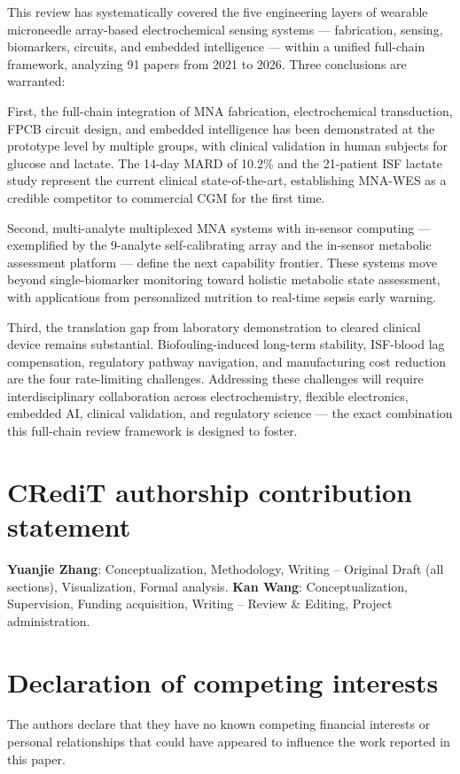\documentclass[review,1p]{elsarticle}
\begin{document}
This review has systematically covered the five engineering layers of wearable microneedle array-based electrochemical sensing systems — fabrication, sensing, biomarkers, circuits, and embedded intelligence — within a unified full-chain framework, analyzing 91 papers from 2021 to 2026. Three conclusions are warranted:

First, the full-chain integration of MNA fabrication, electrochemical transduction, FPCB circuit design, and embedded intelligence has been demonstrated at the prototype level by multiple groups, with clinical validation in human subjects for glucose and lactate. The 14-day MARD of 10.2\% \cite{Yang2023CGM14day} and the 21-patient ISF lactate study \cite{Djassemi2026ACSsens} represent the current clinical state-of-the-art, establishing MNA-WES as a credible competitor to commercial CGM for the first time.

Second, multi-analyte multiplexed MNA systems with in-sensor computing — exemplified by the 9-analyte self-calibrating array \cite{Li2025Innovation} and the in-sensor metabolic assessment platform \cite{Fan2026EdgeAI} — define the next capability frontier. These systems move beyond single-biomarker monitoring toward holistic metabolic state assessment, with applications from personalized nutrition to real-time sepsis early warning.

Third, the translation gap from laboratory demonstration to cleared clinical device remains substantial. Biofouling-induced long-term stability, ISF-blood lag compensation, regulatory pathway navigation, and manufacturing cost reduction are the four rate-limiting challenges. Addressing these challenges will require interdisciplinary collaboration across electrochemistry, flexible electronics, embedded AI, clinical validation, and regulatory science — the exact combination this full-chain review framework is designed to foster.

\section*{CRediT authorship contribution statement}
\textbf{Yuanjie Zhang}: Conceptualization, Methodology, Writing -- Original Draft (all sections), Visualization, Formal analysis.
\textbf{Kan Wang}: Conceptualization, Supervision, Funding acquisition, Writing -- Review \& Editing, Project administration.

\section*{Declaration of competing interests}
The authors declare that they have no known competing financial interests or personal relationships that could have appeared to influence the work reported in this paper.
\end{document}
